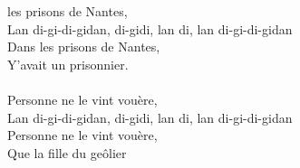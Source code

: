 
 les prisons de Nantes,
\\Lan di-gi-di-gidan, di-gidi, lan di, lan di-gi-di-gidan
\\Dans les prisons de Nantes,
\\Y'avait un prisonnier. ~~\bissimple
\\\\Personne ne le vint vouère,
\\Lan di-gi-di-gidan, di-gidi, lan di, lan di-gi-di-gidan
\\Personne ne le vint vouère,
\\Que la fille du geôlier ~~~~~~\bissimple
